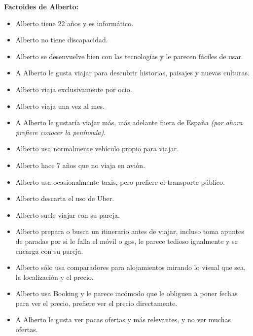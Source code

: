 \textbf{Factoides de Alberto:}

\begin{itemize}
    \item Alberto tiene 22 años y es informático.
    \item Alberto no tiene discapacidad.
    \item Alberto se desenvuelve bien con las tecnologías y le parecen fáciles de usar.
    \item A Alberto le gusta viajar para descubrir historias, paisajes y nuevas culturas.
    \item Alberto viaja exclusivamente por ocio.
    \item Alberto viaja una vez al mes.
    \item A Alberto le gustaría viajar más, más adelante fuera de España \textit{(por ahora prefiere conocer la península)}.
    \item Alberto usa normalmente vehículo propio para viajar.
    \item Alberto hace 7 años que no viaja en avión.
    \item Alberto usa ocasionalmente taxis, pero prefiere el transporte público.
    \item Alberto descarta el uso de Uber.
    \item Alberto suele viajar con su pareja.
    \item Alberto prepara o busca un itinerario antes de viajar, incluso toma apuntes de paradas por si le falla el móvil o gps, le parece tedioso igualmente y se encarga con su pareja.
    \item Alberto sólo usa comparadores para alojamientos mirando lo visual que sea, la localización y el precio.
    \item Alberto usa Booking y le parece incómodo que le obliguen a poner fechas para ver el precio, prefiere ver el precio directamente.
    \item A Alberto le gusta ver pocas ofertas y más relevantes, y no ver muchas ofertas.
\end{itemize}


